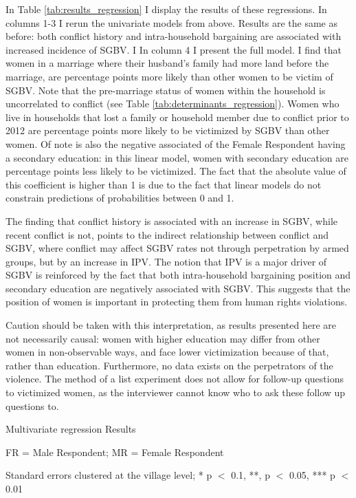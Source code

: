 In Table \ref{tab:results_regression} I display the results of these regressions. In columns 1-3 I rerun the univariate models from above. Results are the same as before: both conflict history and intra-household bargaining are associated with increased incidence of SGBV. I In column 4 I present the full model. I find that women in a marriage where their husband's family had more land before the marriage, are  percentage points more likely than other women to be victim of SGBV. Note that the pre-marriage status of women within the household is uncorrelated to conflict (see Table \ref{tab:determinants_regression}). Women who live in households that lost a family or household member due to conflict prior to 2012 are  percentage points more likely to be victimized by SGBV than other women. Of note is also the negative associated of the Female Respondent having a secondary education: in this linear model, women with secondary education are  percentage points less likely to be victimized. The fact that the absolute value of this coefficient is higher than 1 is due to the fact that linear models do not constrain predictions of probabilities between 0 and 1.

The finding that conflict history is associated with an increase in SGBV, while recent conflict is not, points to the indirect relationship between conflict and SGBV, where conflict may affect SGBV rates not through perpetration by armed groups, but by an increase in IPV. The notion that IPV is a major driver of SGBV is reinforced by the fact that both intra-household bargaining position and secondary education are negatively associated with SGBV.  This suggests that the position of women is important in protecting them from human rights violations.

Caution should be taken with this interpretation, as results presented here are not necessarily causal: women with higher education may differ from other women in non-observable ways, and face lower victimization because of that, rather than education. Furthermore, no data exists on the perpetrators of the violence. The method of a list experiment does not allow for follow-up questions to victimized women, as the interviewer cannot know who to ask these follow up questions to.

\begin{threeparttable}
	\caption{Multivariate regression Results}\label{tab:results_regression}
	\centering
	\scriptsize
	
	
	\begin{tablenotes}
	\small
	 \item FR = Male Respondent; MR = Female Respondent
	 \item Standard errors clustered at the village level; * p $<$ 0.1, **, p $<$ 0.05, *** p $<$ 0.01
	\end{tablenotes}

\end{threeparttable}

